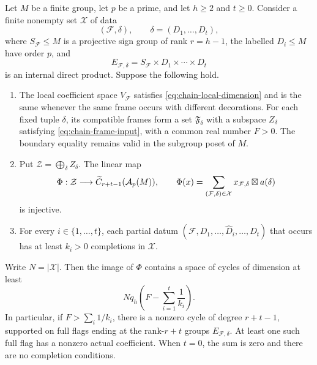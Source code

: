 \begin{lemma}\label{lem:decorations}
Let $M$ be a finite group, let $p$ be a prime, and let $h\geq2$ and
$t\geq0$. Consider a finite nonempty set $\mathcal X$ of data
\[
 (\mathcal F,\delta),\qquad
 \delta=(D_1,\ldots,D_t),
\]
where $S_{\mathcal F}\leq M$ is a projective sign group of rank
$r=h-1$, the labelled $D_i\leq M$ have order $p$, and
\[
 E_{\mathcal F,\delta}
   =S_{\mathcal F}\times D_1\times\cdots\times D_t
\]
is an internal direct product. Suppose the following hold.
\begin{enumerate}
\item The local coefficient space $V_{\mathcal F}$ satisfies
\eqref{eq:chain-local-dimension} and is the same whenever the same
frame occurs with different decorations. For each fixed tuple
$\delta$, its compatible frames form a set $\mathfrak F_\delta$
with a subspace $Z_\delta$ satisfying
\eqref{eq:chain-frame-input}, with a common real number $F>0$.
The boundary equality remains valid in the subgroup poset of $M$.
\item Put $\mathcal Z=\bigoplus_\delta Z_\delta$. The linear map
\begin{equation}\label{eq:chain-detection-map}
 \Phi:\mathcal Z\longrightarrow
       \widetilde C_{r+t-1}(\mathcal A_p(M)),\qquad
 \Phi(x)=\sum_{(\mathcal F,\delta)\in\mathcal X}
 x_{\mathcal F,\delta}\boxtimes a(\delta)
\end{equation}
is injective.
\item For every $i\in\{1,\ldots,t\}$, each partial datum
$(\mathcal F,D_1,\ldots,\widehat D_i,\ldots,D_t)$ that occurs
has at least $k_i>0$ completions in $\mathcal X$.
\end{enumerate}
Write $N=|\mathcal X|$. Then the image of $\Phi$ contains a space
of cycles of dimension at least
\begin{equation}\label{eq:chain-decoration-dimension}
 Nq_h\left(F-\sum_{i=1}^t\frac1{k_i}\right).
\end{equation}
In particular, if $F>\sum_i1/k_i$, there is a nonzero cycle of
degree $r+t-1$, supported on full flags ending at the rank-$r+t$
groups $E_{\mathcal F,\delta}$. At least one such full flag has
a nonzero actual coefficient. When $t=0$, the sum is zero and
there are no completion conditions.
\end{lemma}


